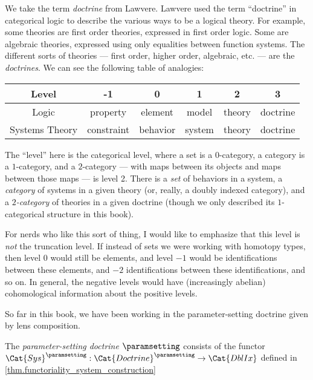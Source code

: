 \documentclass[DynamicalBook]{subfiles}
\begin{document}
  \begin{remark}
    We take the term \emph{doctrine} from Lawvere. Lawvere used the term ``doctrine'' in categorical logic to describe the various ways to be a logical theory. For example, some theories are first order theories, expressed in first order logic. Some are algebraic theories, expressed using only equalities between function systems. The different sorts of theories --- first order, higher order, algebraic, etc. --- are the \emph{doctrines}. We can see the following table of analogies:
    \begin{center}
    \begin{tabular}{|c|c|c|c|c|c|}
      \hline
      Level & -1 & 0 & 1 & 2 & 3 \\ \hline
      Logic & property & element & model & theory & doctrine \\ \hline
      Systems Theory & constraint & behavior & system & theory & doctrine \\ \hline
      \end{tabular}
      \end{center}
      The ``level'' here is the categorical level, where a set is a $0$-category, a category is a $1$-category, and a $2$-category --- with maps between its objects and maps between those maps --- is level 2. There is a \emph{set} of behaviors in a system, a \emph{category} of systems in a given theory (or, really, a doubly indexed category), and a \emph{$2$-category} of theories in a given doctrine (though we only described its $1$-categorical structure in this book).

      For nerds who like this sort of thing, I would like to emphasize that this level is \emph{not} the truncation level. If instead of sets we were working with homotopy types, then level $0$ would still be elements, and level $-1$ would be identifications between these elements, and $-2$ identifications between these identifications, and so on. In general, the negative levels would have (increasingly abelian) cohomological information about the positive levels.


  \end{remark}

So far in this book, we have been working in the parameter-setting doctrine given by lens composition.
\begin{definition}
The \emph{parameter-setting doctrine} $\paramsetting$ consists of the functor $\Cat{Sys}^{{\paramsetting}} : \Cat{Doctrine}^{\paramsetting} \to \Cat{DblIx}$ defined in \cref{thm.functoriality_system_construction}
  \end{definition}
\end{document}
